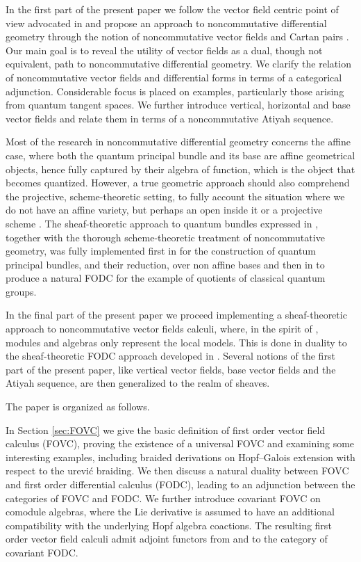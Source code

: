 \documentclass{article}
\theoremstyle{definition}
\begin{document}
	\medskip
	In the first part of the present paper we follow the vector field centric point of view advocated in \cite{paolo, AschieriSchupp} and propose an approach to noncommutative differential geometry through the notion of noncommutative vector fields and Cartan pairs \cite{Bor96, Bor97}. Our main goal is to reveal the utility of vector fields as a dual, though not equivalent, path to noncommutative differential geometry. We clarify the relation of noncommutative vector fields and differential forms in terms of a categorical adjunction. Considerable focus is placed on examples, particularly those arising from quantum tangent spaces. We further introduce vertical, horizontal and base vector fields and relate them in terms of a noncommutative Atiyah sequence. 
	
	\medskip
	Most of the research in noncommutative differential geometry concerns the affine case, where both the quantum principal bundle and its base are affine geometrical objects, hence fully captured by their algebra of function,
	which is the object that becomes quantized. However, a true geometric approach should also
	comprehend the projective, scheme-theoretic setting, to fully account the situation where
	we do not have an affine variety, but perhaps an open inside it or a projective scheme \cite{artin, vov, ro}.
	The sheaf-theoretic approach to quantum bundles expressed in \cite{pflaum}, together with
	the thorough scheme-theoretic treatment of noncommutative geometry, was fully implemented
	first in \cite{afl,FLP} for the construction of quantum principal bundles, and their reduction, over non affine bases and then in \cite{aflw} to produce a natural FODC for the example of quotients of classical quantum groups.
	
	\medskip
	In the final part of the present paper we proceed implementing a sheaf-theoretic approach 
	to noncommutative vector fields calculi,
	where, in the spirit of \cite{afl}, modules and algebras only represent the local models. This is done in duality to the sheaf-theoretic FODC approach developed in \cite{aflw}. Several notions of the first part of the present paper, like vertical vector fields, base vector fields and the Atiyah sequence, are then generalized to the realm of sheaves.
	
	\medskip
	The paper is organized as follows.
	
	\medskip
	In Section \ref{sec:FOVC} we give the basic definition of first order vector field calculus (FOVC),
	proving the existence of a universal FOVC and examining 
	some interesting examples, including braided derivations on Hopf--Galois extension with respect to the \DJ ur\dj evi\'c braiding.
	We then discuss a natural duality between FOVC and first order differential calculus (FODC), leading to an adjunction between the categories of FOVC and FODC.
	We further introduce covariant FOVC on comodule algebras, where the Lie derivative is assumed to have an additional compatibility with the underlying Hopf algebra coactions. The resulting first order vector field calculi admit adjoint functors from and to the category of covariant FODC.
	
\end{document}
